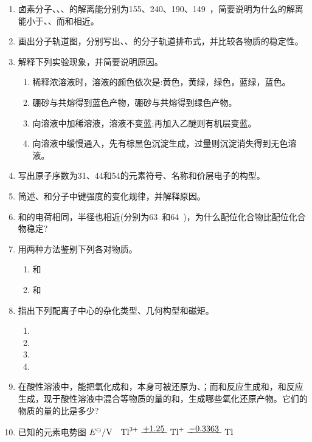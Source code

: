 \begin{enumerate}[label=\arabic*., start=1, itemsep=1.5ex]
    \item 卤素分子、、、的解离能分别为155、240、190、149\ ，简要说明为什么的解离能小于、、而和相近。
    \item 画出分子轨道图，分别写出、、的分子轨道排布式，并比较各物质的稳定性。
    \item 解释下列实验现象，并简要说明原因。
    \begin{enumerate}[label=(\arabic*), itemsep=1ex]
        \item 稀释浓溶液时，溶液的颜色依次是:黄色，黄绿，绿色，蓝绿，蓝色。
        \item 硼砂与共熔得到蓝色产物，硼砂与共熔得到绿色产物。
        \item 向溶液中加稀溶液，溶液不变蓝;再加入乙醚则有机层变蓝。
        \item 向溶液中缓慢通入，先有棕黑色沉淀生成，过量则沉淀消失得到无色溶液。
    \end{enumerate}
    \item 写出原子序数为31、44和54的元素符号、名称和价层电子的构型。
    \item 简述、和分子中键强度的变化规律，并解释原因。
    \item {}和的电荷相同，半径也相近(分别为63\ 和64\ )，为什么配位化合物比配位化合物稳定?
    \item 用两种方法鉴别下列各对物质。
    \begin{enumerate}[label=(\arabic*), itemsep=1ex]
        \item {}和
        \item {}和
    \end{enumerate}
    \item 指出下列配离子中心的杂化类型、几何构型和磁矩。
    \begin{enumerate}[label=(\arabic*), itemsep=1ex]
        \item {}
        \item {}
        \item {}
        \item {}
    \end{enumerate}
    \item 在酸性溶液中，能把氧化成和，本身可被还原为、；而和反应生成和，和反应生成，现于酸性溶液中混合等物质的量的和，生成哪些氧化还原产物。它们的物质的量的比是多少?
    \item 已知的元素电势图
    $E^\ominus/\text{V} \quad 
    \ce{Tl^{3+}} 
    \xline{\raisebox{0.5ex}{$+1.25$}} 
    \ce{Tl^{+}} 
    \xline{\raisebox{0.5ex}{$-0.3363$}} 
    \ce{Tl}$


\end{enumerate}
